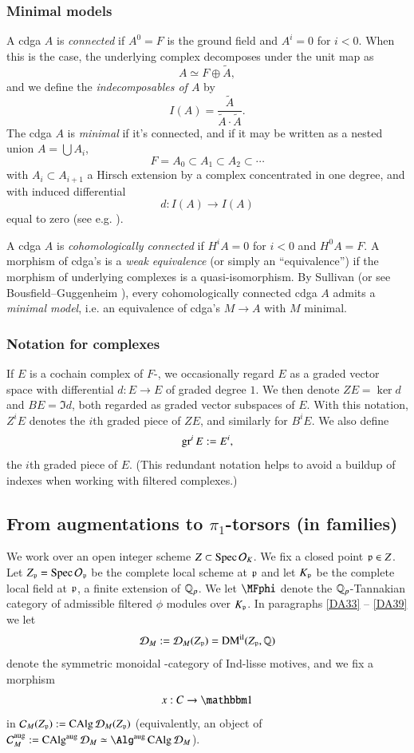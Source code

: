 \subsubsection{Minimal models}
\label{LA25}
A cdga $A$ is \emph{connected} if $A^0 = F$ is the ground field and $A^i = 0$ for $i<0$. When this is the case, the underlying complex decomposes under the unit map as
\[
A \simeq F \oplus \tilde A,
\]
and we define the \emph{indecomposables of $A$} by
\[
I(A) = \frac {\tilde A}  {\tilde A \cdot \tilde A}.
\]
The cdga $A$ is \emph{minimal} if it's connected, and if it may be written as a nested union $A = \bigcup A_i$,
\[
F = A_0 \subset A_1 \subset A_2 \subset \cdots
\]
with $A_i \subset A_{i+1}$ a Hirsch extension by a complex concentrated in one degree, and with induced differential
\[
d: I(A) \to I(A)
\]
equal to zero (see e.g. \cite[Definition 5.2]{Morgan}). 

A cdga $A$ is \emph{cohomologically connected} if $H^iA = 0$ for $i<0$ and $H^0A = F$. A morphism of cdga's is a \emph{weak equivalence} (or simply an ``equivalence'') if the morphism of underlying complexes is a quasi-isomorphism. By Sullivan \cite{Sullivan} (or see Bousfield--Guggenheim \cite{BousfieldGug}), every cohomologically connected cdga $A$ admits a \emph{minimal model}, i.e. an equivalence of cdga's $M \to A$ with $M$ minimal.

\subsubsection{Notation for complexes}
\label{NC55}
If $E$ is a cochain complex of $F$-\vectorspaces, we occasionally regard $E$ as a graded vector space with differential $d: E \to E$ of graded degree $1$. We then denote $ZE = \ker d$ and $BE = \Im d$, both regarded as graded vector subspaces of $E$. With this notation, $Z^iE$ denotes the $i$th graded piece of $ZE$, and similarly for $B^iE$. We also define
\[
\operatorname{gr}^iE := E^i, 
\]
the $i$th graded piece of $E$. (This redundant notation helps to avoid a buildup of indexes when working with filtered complexes.)

\subsection{From augmentations to $\pi_1$-torsors (in families)}
\label{sSec:tors}

\sspar{}\label{DA22}
We work over an open integer scheme $Z \subset 
\operatorname{Spec} \mathcal{O}_K$. We fix a closed point $\mathfrak{p} \in Z$. Let $Z_{\mathfrak{p}} = \operatorname{Spec} \mathcal{O}_{\mathfrak{p}}$ be the complete local scheme at $\mathfrak{p}$ and let $K_{\mathfrak{p}}$ be the complete local field at $\mathfrak{p}$, a finite extension of ${\mathbb{Q}_p}$. We let $\MFphi$ denote the ${\mathbb{Q}_p}$-Tannakian category of admissible filtered $\phi$ modules over $K_{\mathfrak{p}}$. In paragraphs \ref{DA33} -- \ref{DA39} we let
\[
\mathcal{D}_M := \mathcal{D}_M(Z_{\mathfrak{p}}) = \operatorname{DM}^{\mathrm{il}}(Z_{\mathfrak{p}}, \mathbb{Q})
\]
denote the symmetric monoidal \oo-category of Ind-lisse motives, and we fix a morphism 
\[
x: C \to \one
\]
in $\mathcal{C}_M(Z_{\mathfrak{p}}):= \operatorname{CAlg} \mathcal{D}_M(Z_{\mathfrak{p}})$ (equivalently, an object of $\Cc_M^\m{aug} := \CAlg^\m{aug}\Dd_M \simeq \Alg^\m{aug}\CAlg \Dd_M$).

